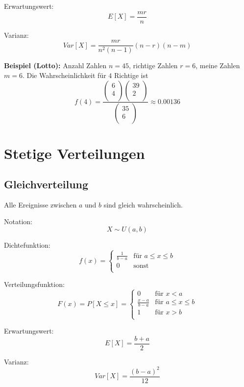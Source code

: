 \documentclass[10pt,a4paper,twocolumn]{article}
\begin{document}
Erwartungswert:
\[
E[X]=\frac{mr}{n}
\]

Varianz:
\[
Var[X]=\frac{mr}{n^2(n-1)}(n-r)(n-m)
\]

\textbf{Beispiel (Lotto):} Anzahl Zahlen $n=45$, richtige Zahlen $r=6$, meine Zahlen $m=6$. Die Wahrscheinlichkeit für $4$ Richtige ist
\[
f(4)=\frac{
	\left(
	\begin{array}{c}
		6 \\
		4 \\
	\end{array}
	\right)
	\left(
	\begin{array}{c}
		39 \\
		2 \\
	\end{array}
	\right)
}{
	\left(
	\begin{array}{c}
		35 \\
		6 \\
	\end{array}
	\right)
}\approx 0.00136
\]

\section{Stetige Verteilungen}

\subsection{Gleichverteilung}
Alle Ereignisse zwischen $a$ und $b$ sind gleich wahrscheinlich.

\vspace{10pt}

Notation:
\[
X \sim U(a,b)
\]

Dichtefunktion:
\[
f(x)=
\begin{cases}
	\frac{1}{b-a} & \text{für $a \leq x \leq b$} \\
	0 & \text{sonst} \\
\end{cases} 
\]

Verteilungsfunktion:
\[
F(x)=P[X \leq x]=
\begin{cases}
	0 & \text{für $x < a$} \\	
	\frac{x-a}{b-a} & \text{für $a \leq x \leq b$} \\
	1 & \text{für $x > b$} \\
\end{cases} 
\]

Erwartungswert:
\[
E[X]=\frac{b+a}{2}
\]

Varianz:
\[
Var[X]=\frac{(b-a)^2}{12}
\]
\end{document}
